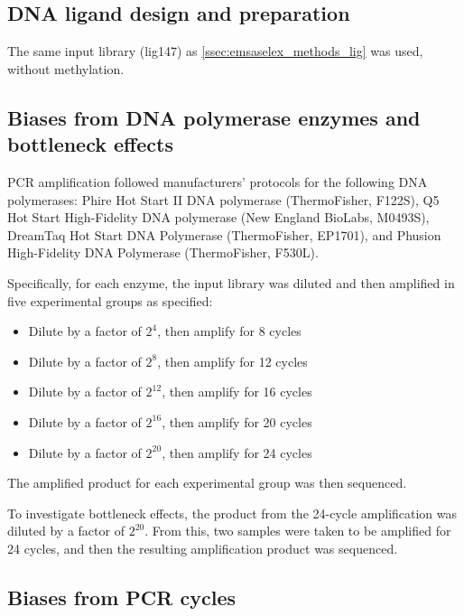 \documentclass[a4paper, numbers=noenddot]{scrbook}
\begin{document}
\subsection{DNA ligand design and preparation}
\label{ssec:pcrbias_methods_lig}

The same input library (lig147) as \ref{ssec:emsaselex_methods_lig} was used, without methylation.

\subsection{Biases from DNA polymerase enzymes and bottleneck effects}
\label{ssec:pcrbias_methods_enz}

PCR amplification followed manufacturers' protocols for the following DNA polymerases: Phire Hot Start II DNA polymerase (ThermoFisher, F122S), Q5 Hot Start High-Fidelity DNA polymerase (New England BioLabs, M0493S), DreamTaq Hot Start DNA Polymerase (ThermoFisher, EP1701), and Phusion High-Fidelity DNA Polymerase (ThermoFisher, F530L).

Specifically, for each enzyme, the input library was diluted and then amplified in five experimental groups as specified:

\begin{itemize}
  \item Dilute by a factor of $2^{4}$, then amplify for 8 cycles
  \item Dilute by a factor of $2^{8}$, then amplify for 12 cycles
  \item Dilute by a factor of $2^{12}$, then amplify for 16 cycles
  \item Dilute by a factor of $2^{16}$, then amplify for 20 cycles
  \item Dilute by a factor of $2^{20}$, then amplify for 24 cycles
\end{itemize}

The amplified product for each experimental group was then sequenced.

To investigate bottleneck effects, the product from the 24-cycle amplification was diluted by a factor of $2^{20}$.  From this, two samples were taken to be amplified for 24 cycles, and then the resulting amplification product was sequenced.

\subsection{Biases from PCR cycles}
\label{ssec:pcrbias_methods_pcr}
\end{document}
